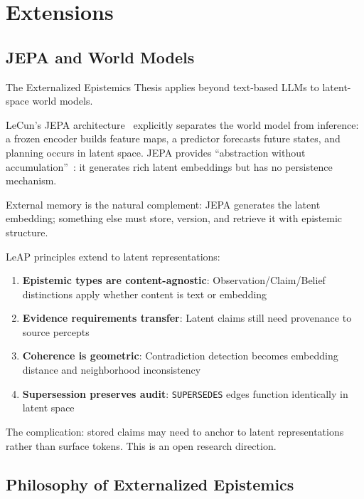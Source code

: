 \documentclass[11pt,letterpaper]{article}
\begin{document}
\section{Extensions}
\label{sec:extensions}

\subsection{JEPA and World Models}

The Externalized Epistemics Thesis applies beyond text-based LLMs to latent-space world models.

LeCun's JEPA architecture~\cite{lecun2022path} explicitly separates the world model from inference: a frozen encoder builds feature maps, a predictor forecasts future states, and planning occurs in latent space. JEPA provides ``abstraction without accumulation''~\cite{aampe2026}: it generates rich latent embeddings but has no persistence mechanism.

External memory is the natural complement: JEPA generates the latent embedding; something else must store, version, and retrieve it with epistemic structure.

LeAP principles extend to latent representations:

\begin{enumerate}[noitemsep]
    \item \textbf{Epistemic types are content-agnostic}: Observation/Claim/Belief distinctions apply whether content is text or embedding
    \item \textbf{Evidence requirements transfer}: Latent claims still need provenance to source percepts
    \item \textbf{Coherence is geometric}: Contradiction detection becomes embedding distance and neighborhood inconsistency
    \item \textbf{Supersession preserves audit}: \texttt{SUPERSEDES} edges function identically in latent space
\end{enumerate}

The complication: stored claims may need to anchor to latent representations rather than surface tokens. This is an open research direction.

\subsection{Philosophy of Externalized Epistemics}
\end{document}
